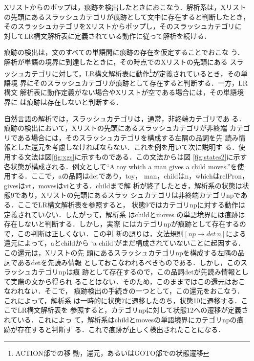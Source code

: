 Xリストからのポップは，痕跡を検出したときにおこなう．解析系は，Xリスト
の先頭にあるスラッシュカテゴリが痕跡として文中に存在すると判断したとき，
そのスラッシュカテゴリをXリストからポップし，そのスラッシュカテゴリに
対してLR構文解析表に定義されている動作に従って解析を続ける．

痕跡の検出は，文のすべての単語間に痕跡の存在を仮定することでおこな
う．解析が単語の境界に到達したときに，その時点でのXリストの先頭にある
スラッシュカテゴリに対して，LR構文解析表に動作\footnote{ACTION部での移
動，還元，あるいはGOTO部での状態遷移}が定義されているとき，その単語境
界にそのスラッシュカテゴリが痕跡として存在すると判断する．一方，LR構文
解析表に動作定義がない場合やXリストが空である場合には，その単語境界に
は痕跡は存在しないと判断する．

自然言語の解析では，スラッシュカテゴリは，通常，非終端カテゴリであ
る．痕跡の検出において，Xリストの先頭にあるスラッシュカテゴリが非終端
カテゴリである場合には，そのスラッシュカテゴリを構成する左隅の品詞を先
読み情報とした還元を考慮しなければならない．これを例を用いて次に説明す
る．使用する文法は図\ref{fig:xgs}に示すものである．この文法からは図
\ref{fig:states2}に示す各状態が構成される．例文として``A toy which a
man gives a child moves.''を使用する．ここで，aの品詞はdetであり，toy，
man，childはn，whichはrelPron，givesはvt，movesはviとする．childまで解
析が終了したとき，解析系の状態は状態9であり，Xリストの先頭にあるスラッ
シュカテゴリは非終端カテゴリnpである．ここでLR構文解析表を参照すると，
状態9ではカテゴリnpに対する動作は定義されていない．したがって，解析系
はchildとmoves の単語境界には痕跡は存在しないと判断する．しかし，実際
にはカテゴリnpが痕跡として存在するので，この判断は正しくない．この判
断の誤りは，文法規則$[np \to det\ n]$による還元によって，aとchildから
`a child'がまだ構成されていないことに起因する．この還元は，Xリストの先
頭にあるスラッシュカテゴリnpを構成する左隅の品詞であるdetを先読み情報
としておこなわれるべきものである．しかし，このスラッシュカテゴリnpは痕
跡として存在するので，この品詞detが先読み情報として実際の文から得られ
ることはない．そのため，このままではこの還元はおこなわれない．そこで，
痕跡検出の手続きの一つとして，この還元をおこなう．これによって，解析系
は一時的に状態7に遷移したのち，状態10に遷移する．ここでLR構文解析表を
参照すると，カテゴリnpに対して状態12への遷移が定義されている．これによっ
て，解析系はchildとmovesの単語境界にカテゴリnpの痕跡が存在すると判断す
る．これで痕跡が正しく検出されたことになる．

\newlength{\vs}
\setlength{\vs}{2mm}
\setlength{\mpw}{4.5cm}

